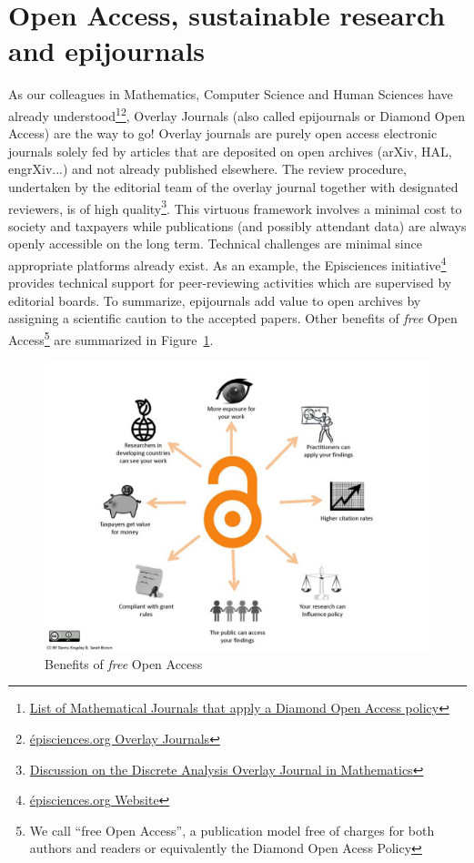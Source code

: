 \documentclass[11pt]{article}
\begin{document}
\section*{Open Access, sustainable research and epijournals}
As our colleagues in Mathematics, Computer Science and Human Sciences have already understood\footnote{\href{https://www.cimpa.info/en/node/62}{List of Mathematical Journals that apply a Diamond Open Access policy}}\footnote{\href{https://www.episciences.org/page/journals}{épisciences.org Overlay Journals}}, Overlay Journals (also called epijournals or Diamond Open Access) are the way to go! Overlay journals are purely open access electronic journals solely fed by articles that are deposited on open archives (arXiv, HAL, engrXiv...) and not already published elsewhere. The review procedure, undertaken by the editorial team of the overlay journal together with designated reviewers, is of high quality\footnote{\href{http://discreteanalysisjournal.com/articles and its announcement by Nature https://www.nature.com/news/leading-mathematician-launches-arxiv-overlay-journal-1.18351}{Discussion on the Discrete Analysis Overlay Journal in Mathematics}}. This virtuous framework involves a minimal cost to society and taxpayers while publications (and possibly attendant data) are always openly accessible on the long term. Technical challenges are minimal since appropriate platforms already exist. As an example, the Episciences initiative\footnote{\href{https://www.episciences.org/?lang=en}{épisciences.org Website}} provides technical support for peer-reviewing activities which are supervised by editorial boards. To summarize, epijournals add value to open archives by assigning a scientific caution to the accepted papers. Other benefits of \emph{free} Open Access\footnote{We call ``free Open Access'', a publication model free of charges for both authors and readers or equivalently the Diamond Open Acess Policy} are summarized in Figure~\ref{fig:OA}.
\begin{figure}[ht]\centering%
\includegraphics[width=14cm]{OA.jpg}\caption{Benefits of \emph{free} Open Access}\label{fig:OA}
\end{figure}
\end{document}
